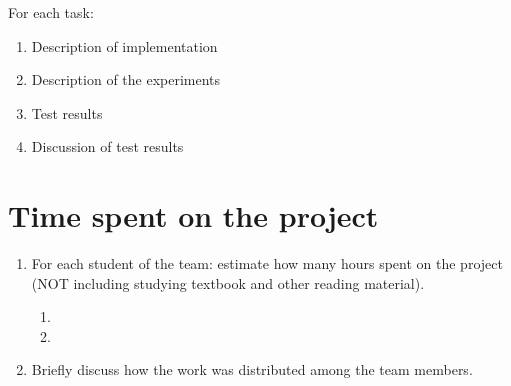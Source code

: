 \documentclass[a4paper,11pt]{article}
\begin{document}
\noindent
For each task:
\begin{enumerate}
\item	 Description of implementation
\item	 Description of the experiments
\item Test results
\item Discussion of test results

\end{enumerate}

\section*{Time spent on the project}
\begin{enumerate}
\item	For each student of the team: estimate how many hours spent on the project (NOT including studying textbook and other reading material).
\begin{enumerate}
\item	
\item
\end{enumerate}
\item	Briefly discuss how the work was distributed among the team members.
\end{enumerate}
\end{document}
